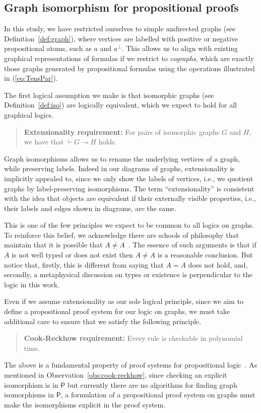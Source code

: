 \documentclass{lmcs} %
\def\cneg#1{{#1^\bot}}
\def\gG{G}
\def\gH{H}
\theoremstyle{plain}
\begin{document}
\subsection*{Graph isomorphism for propositional proofs}

In this study, we have restricted ourselves to simple undirected graphs (see Definition~\ref{def:graph}),
where vertices are labelled with positive or negative propositional atoms, such as $a$ and $\cneg{a}$.
This allows us to align with existing graphical representations of formulas if we restrict to \emph{cographs}, which are exactly those graphs generated by propositional formulas using the operations illustrated in (\ref{eq:TensPar}).

The first logical assumption we make is that isomorphic graphs (see Definition~\ref{def:iso}) are logically equivalent, which we expect to hold for all graphical logics.   
\begin{quote}
	\textbf{Extensionality requirement:} For pairs of isomorphic graphs $\gG$ and $\gH$, we have that $\vdash \gG \multimap \gH$ holds.
\end{quote}
Graph isomorphisms allows us to rename the underlying vertices of a graph, while preserving labels. Indeed in our diagrams of graphs, extensionality is implicitly appealed to, since we only show the labels of vertices, i.e., we quotient graphs by label-preserving isomorphisms.
The term ``{extensionality}'' is consistent with the idea that objects are equivalent if their externally visible properties, i.e., their labels and edges shown in diagrams, are the same.


This is one of the few principles we expect to be common to all logics on graphs.
To reinforce this belief, we acknowledge there are schools of philosophy that maintain that it is possible that $A\neq A$~\cite{Mates1968}. The essence of such arguments is that if $A$ is not well typed or does not exist then $A \neq A$ is a reasonable conclusion. But notice that, firstly, this is different from saying that $A = A$ does not hold, and, secondly, a metaphysical discussion on types or existence is perpendicular to the logic in this work.




Even if we assume extensionality as our sole logical principle,
since we aim to define a propositional proof system for our logic on graphs, we must take additional care to ensure that we satisfy the following principle.
\begin{quote}
	\textbf{Cook-Reckhow requirement:} Every rule is checkable in polynomial time.
\end{quote}
The above is a fundamental property of proof systems for propositional logic~\cite{Cook1979}.
As mentioned in Observation~\ref{obs:cook-reckhow}, since checking an explicit isomorphism is in $\textsf{P}$ but
currently 
there are no algorithms for finding graph isomorphisms in $\textsf{P}$, a formulation of a propositional proof system on graphs must make the isomorphisms explicit in the proof system.
\end{document}
